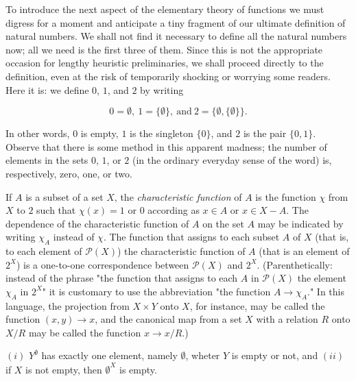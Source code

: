 To introduce the next aspect of the elementary theory of functions we must digress for a moment and anticipate a tiny fragment of our ultimate definition of natural numbers. We shall not find it necessary to define all the natural numbers now; all we need is the first three of them. Since this is not the appropriate occasion for lengthy heuristic preliminaries, we shall proceed directly to the definition, even at the risk of temporarily shocking or worrying some readers. Here it is: we define  $0$, $1$, and $2$ by writing 

\begin{equation*}
0 = \emptyset , \: 1=\{ \emptyset \} , \: \text{and} \: 2 = \{ \emptyset , \{ \emptyset \} \} . 
\end{equation*}

In other words, $0$ is empty, $1$ is the singleton $\{ 0 \}$, and $2$ is the pair $ \{ 0, 1 \}$. Observe that there is some method in this apparent madness; the number of elements in the sets $0$, $1$, or $2$ (in the ordinary everyday sense of the word) is, respectively, zero, one, or two.   

If $A$ is a subset of a set $X$, the \textit{characteristic function} of $A$ is the function $\chi$ from $X$ to $2$ such that $\chi (x) = 1$ or $0$ according as $x \in A$ or $x \in X - A$. The dependence of the characteristic function of $A$ on the set $A$ may be indicated by writing $\chi_{A}$ instead of $\chi$. The function that assigns to each subset $A$ of $X$ (that is, to each element of $\mathcal{P}(X)$) the characteristic function of $A$ (that is an element of $2^{X}$) is a one-to-one correspondence between $\mathcal{P}(X)$ and $2^{X}$. (Parenthetically: instead of the phrase "the function that assigns to each $A$ in $\mathcal{P}(X)$ the element $\chi_{A}$ in $2^{X}$" it is customary to use the abbreviation "the function $A \rightarrow \chi_{A}$." In this language, the projection from $X \times Y$ onto $X$, for instance, may be called the function $(x, y) \rightarrow x$, and the canonical map from a set $X$ with a relation $R$ onto $X/R$ may be called the function $x \rightarrow x/R$.) 

\begin{exercise} $(i)$ $Y^{\emptyset}$ has exactly one element, namely $\emptyset$, wheter $Y$ is empty or not, and $(ii)$ if $X$ is not empty, then $\emptyset^{X}$ is empty.

\end{exercise}